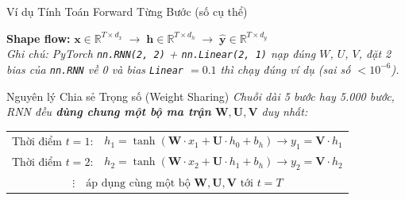 \documentclass[aspectratio=169, 10pt]{beamer}
\begin{document}
\begin{frame}{Ví dụ Tính Toán Forward Từng Bước (số cụ thể)}
\vspace{0.15cm}
\begin{center}
\small
\textbf{Shape flow:}\; $\mathbf{x} \in \mathbb{R}^{T \times d_x} \;\longrightarrow\; \mathbf{h} \in \mathbb{R}^{T \times d_h} \;\longrightarrow\; \hat{\mathbf{y}} \in \mathbb{R}^{T \times d_y}$\\[3pt]
{\footnotesize \textcolor{slate}{\textit{Ghi chú: PyTorch \texttt{nn.RNN(2,\,2)} + \texttt{nn.Linear(2,\,1)} nạp đúng $W$, $U$, $V$, đặt 2 bias của \texttt{nn.RNN} về 0 và bias \texttt{Linear} $= 0.1$ thì chạy đúng ví dụ (sai số $< 10^{-6}$).}}}
\end{center}

\end{frame}

\begin{frame}{Nguyên lý Chia sẻ Trọng số (Weight Sharing)}
\footnotesize
\textit{Chuỗi dài 5 bước hay 5.000 bước, RNN đều \textbf{dùng chung một bộ ma trận} \(\mathbf{W}, \mathbf{U}, \mathbf{V}\) duy nhất:}

\vspace{0.05cm}
\begin{center}
\begin{tabular}{ll}
Thời điểm \(t=1\): & \(h_1 = \tanh( \mathbf{W} \cdot x_1 + \mathbf{U} \cdot h_0 + b_h ) \rightarrow y_1 = \mathbf{V} \cdot h_1\) \\
Thời điểm \(t=2\): & \(h_2 = \tanh( \mathbf{W} \cdot x_2 + \mathbf{U} \cdot h_1 + b_h ) \rightarrow y_2 = \mathbf{V} \cdot h_2\) \\
\multicolumn{2}{c}{\(\vdots \quad \text{áp dụng cùng một bộ } \mathbf{W}, \mathbf{U}, \mathbf{V} \text{ tới } t = T\)} \\
\end{tabular}
\end{center}


\end{frame}
\end{document}
